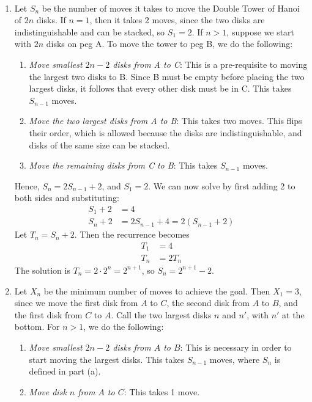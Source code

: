 \documentclass[12pt]{article}
\newenvironment{sol}[1][Solution]{\begin{trivlist}
		\item[\hskip \labelsep {\bfseries #1:}]}{\end{trivlist}}
\begin{document}
\begin{sol}
	\
	\begin{enumerate}[label=(\alph*)]
		\item Let $S_{n}$ be the number of moves it takes to move the Double Tower of
		Hanoi of $2n$ disks.  If $n=1$, then it takes 2 moves, since the two disks are
		indistinguishable and can be stacked, so $S_{1}=2$. If $n>1$, suppose we start
		with $2n$ disks on peg A. To move the tower to peg B, we do the following:
		\begin{enumerate}[label=(\alph*)]
			\item \emph{Move smallest $2n-2$ disks from A to C}: This is a pre-requisite
			to moving the largest two disks to B. Since B must be empty before placing
			the two largest disks, it follows that every other disk must be in C.
			This takes $S_{n-1}$ moves.
			\item  \emph{Move the two largest disks from A to B}: This takes two moves.
			This flips their order, which is allowed because the disks are indistinguishable,
			and disks of the same size can be stacked.
			\item \emph{Move the remaining disks from C to B}: This takes $S_{n-1}$ moves.
		\end{enumerate}
		Hence, $S_{n}=2S_{n-1}+2$, and $S_1=2$. We can now solve by first adding 2
		to both sides and substituting:
		\begin{align*}
			S_1+2&=4\\
			S_n+2&=2S_{n-1}+4=2(S_{n-1}+2)
		\end{align*}
		Let $T_n=S_{n}+2$. Then the recurrence becomes
		\begin{align*}
			T_1&=4\\
			T_{n}&=2T_n
		\end{align*}
		The solution is $T_n=2\cdot 2^{n}=2^{n+1}$, so $S_n=2^{n+1}-2$.
		\item Let $X_n$ be the minimum number of moves to achieve the goal.
		Then $X_1=3$, since we move the first disk from $A$ to $C$, the second
		disk from $A$ to $B$, and the first disk from $C$ to $A$. Call the two
		largest disks $n$ and $n'$, with $n'$ at the bottom. For
		$n>1$, we do the following:
		\begin{enumerate}[label=(\roman*)]
			\item \emph{Move smallest $2n-2$ disks from $A$ to $B$}: This is necessary
			in order to start moving the largest disks. This takes $S_{n-1}$ moves,
			where $S_n$ is defined in part (a).
			\item \emph{Move disk $n$ from $A$ to $C$}: This takes 1 move.

\end{enumerate}
\end{enumerate}
\end{sol}
\end{document}
